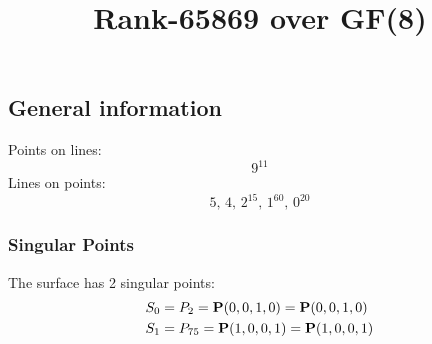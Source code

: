 \documentclass{article}
\newcommand\setTBstruts{\def\T{\rule{0pt}{2.6ex}}%
\def\B{\rule[-1.2ex]{0pt}{0pt}}}
\newcommand{\bP}{{\bf P}}
\begin{document}
 
\setTBstruts



{\allowdisplaybreaks%






\title{Rank-65869 over GF(8)}
\author{}%
\maketitle%
%
{}



\subsection*{General information}
Points on lines:
$$
9^{11}$$
Lines on points:
$$
5,\,4,\,2^{15},\,1^{60},\,0^{20}$$
\subsubsection*{Singular Points}
The surface has 2 singular points:\\
\begin{align*}
S_{0} &= P_{2}=\bP(0, 0, 1, 0) = \bP(0, 0, 1, 0)\\
S_{1} &= P_{75}=\bP(1, 0, 0, 1) = \bP(1, 0, 0, 1)\\
\end{align*}
}
\end{document}
